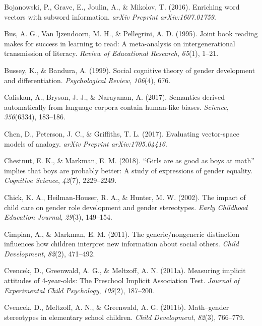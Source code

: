 \documentclass[
  english,
  ,man,floatsintext]{apa6}
\begin{document}
\leavevmode\hypertarget{ref-bojanowski2016enriching}{}%
Bojanowski, P., Grave, E., Joulin, A., \& Mikolov, T. (2016). Enriching word vectors with subword information. \emph{arXiv Preprint arXiv:1607.01759}.

\leavevmode\hypertarget{ref-bus1995joint}{}%
Bus, A. G., Van Ijzendoorn, M. H., \& Pellegrini, A. D. (1995). Joint book reading makes for success in learning to read: A meta-analysis on intergenerational transmission of literacy. \emph{Review of Educational Research}, \emph{65}(1), 1--21.

\leavevmode\hypertarget{ref-bussey1999social}{}%
Bussey, K., \& Bandura, A. (1999). Social cognitive theory of gender development and differentiation. \emph{Psychological Review}, \emph{106}(4), 676.

\leavevmode\hypertarget{ref-caliskan2017semantics}{}%
Caliskan, A., Bryson, J. J., \& Narayanan, A. (2017). Semantics derived automatically from language corpora contain human-like biases. \emph{Science}, \emph{356}(6334), 183--186.

\leavevmode\hypertarget{ref-chen2017evaluating}{}%
Chen, D., Peterson, J. C., \& Griffiths, T. L. (2017). Evaluating vector-space models of analogy. \emph{arXiv Preprint arXiv:1705.04416}.

\leavevmode\hypertarget{ref-chestnut2018girls}{}%
Chestnut, E. K., \& Markman, E. M. (2018). ``Girls are as good as boys at math'' implies that boys are probably better: A study of expressions of gender equality. \emph{Cognitive Science}, \emph{42}(7), 2229--2249.

\leavevmode\hypertarget{ref-chick2002impact}{}%
Chick, K. A., Heilman-Houser, R. A., \& Hunter, M. W. (2002). The impact of child care on gender role development and gender stereotypes. \emph{Early Childhood Education Journal}, \emph{29}(3), 149--154.

\leavevmode\hypertarget{ref-cimpian2011generic}{}%
Cimpian, A., \& Markman, E. M. (2011). The generic/nongeneric distinction influences how children interpret new information about social others. \emph{Child Development}, \emph{82}(2), 471--492.

\leavevmode\hypertarget{ref-cvencek2011measuring}{}%
Cvencek, D., Greenwald, A. G., \& Meltzoff, A. N. (2011a). Measuring implicit attitudes of 4-year-olds: The Preschool Implicit Association Test. \emph{Journal of Experimental Child Psychology}, \emph{109}(2), 187--200.

\leavevmode\hypertarget{ref-cvencek2011math}{}%
Cvencek, D., Meltzoff, A. N., \& Greenwald, A. G. (2011b). Math--gender stereotypes in elementary school children. \emph{Child Development}, \emph{82}(3), 766--779.
\end{document}

